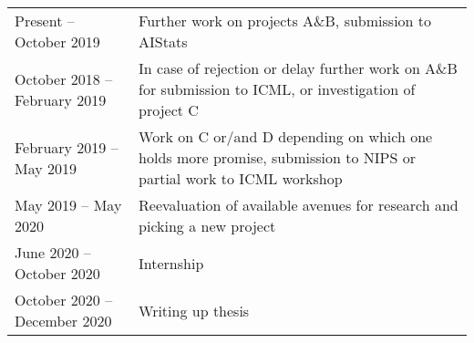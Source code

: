 \documentclass[12pt]{article}
\begin{document}
\begin{table}[h!]
\begin{tabular}{lp{11cm}}
Present -- October 2019         & Further work on projects A\&B, submission to AIStats \\
October 2018 -- February 2019   & In case of rejection or delay further work on A\&B for submission to ICML, or investigation of project C \\
February 2019 -- May 2019       & Work on C or/and D depending on which one holds more promise, submission to NIPS or partial work to ICML workshop \\
May 2019 -- May 2020            & Reevaluation of available avenues for research and picking a new project \\
June 2020 -- October 2020       & Internship \\
October 2020 -- December 2020   & Writing up thesis
\end{tabular}
\end{table}




\newpage 

 

% 
\end{document}
